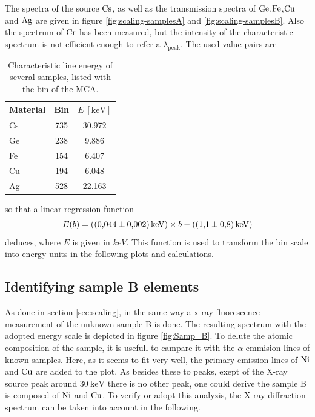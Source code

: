 The spectra of the source $\ce{Cs}$, as well as the transmission spectra of $\ce{Ge}$,$\ce{Fe}$,$\ce{Cu}$ and $\ce{Ag}$ are given in figure \ref{fig:scaling-samplesA} and \ref{fig:scaling-samplesB}.
Also the spectrum of $\ce{Cr}$ has been measured, but the intensity of the characteristic spectrum is not efficient enough to refer a $\lambda_\text{peak}$.
The used value pairs are
\begin{table}
    \caption{Characteristic \alpha line energy of several samples, listed with the bin of the MCA.}
    \label{tab:bin-E}
    \centering
    \begin{tabular}{l S[table-format=3.0] S[table-format=3.3]}
          \toprule
          {Material} & {Bin} & {$E \: [\si{\kilo\eV}]$} \\
          \midrule
          {Cs} & 735 & 30.972 \\
          {Ge} & 238 & 9.886  \\
          {Fe} & 154 & 6.407 \\
          {Cu} & 194 & 6.048 \\
          {Ag} & 528 & 22.163  \\
          \bottomrule
    \end{tabular}
\end{table}
so that a linear regression function 
\begin{equation*}
    E(b) = (\SI{ 0.044 \pm 0.002 }{\kilo\eV}) \times b - (\SI{1.1 \pm 0.8}{\kilo\eV})
\end{equation*}
deduces, where $E$ is given in $keV$. 
This function is used to transform the bin scale into energy units in the following plots and calculations.

\subsection{Identifying sample B elements}
\label{sec:sampleB-fluo}

As done in section \ref{sec:scaling}, in the same way a x-ray-fluorescence measurement of the unknown sample B is done.
The resulting spectrum with the adopted energy scale is depicted in figure \ref{fig:Samp_B}. 
To delute the atomic composition of the sample, it is usefull to campare it with the $\alpha$-emmision lines of known samples.
Here, as it seems to fit very well, the primary emission lines of $\ce{Ni}$ and $\ce{Cu}$ are added to the plot.
As besides these to peaks, exept of the X-ray source peak around $\SI{30}{\kilo\eV}$ there is no other peak, one could derive the sample B is composed of $\ce{Ni}$ and $\ce{Cu}$.
To verify or adopt this analyzis, the X-ray diffraction spectrum can be taken into account in the following.

